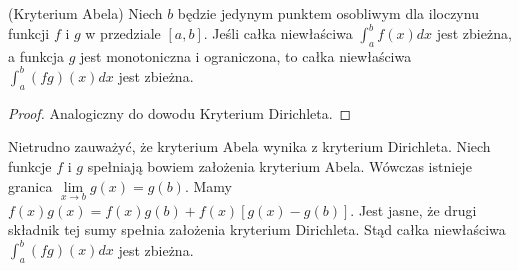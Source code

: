 \documentclass[leqno]{article}
\begin{document}
\begin{justify}
\begin{theorem}
{
    (Kryterium Abela) Niech $b$ będzie jedynym punktem osobliwym dla iloczynu funkcji $f$ i $g$ w przedziale $[a,b]$.
    Jeśli całka niewłaściwa $\int_{a}^{b}f(x)dx$ jest zbieżna, a funkcja $g$ jest monotoniczna i ograniczona, to całka niewłaściwa
    $\int_{a}^{b}(fg)(x)dx$ jest zbieżna.
}
\end{theorem}

\begin{proof}
    Analogiczny do dowodu Kryterium Dirichleta.
\end{proof}

\begin{uwaga}
    Nietrudno zauważyć, że kryterium Abela wynika z kryterium Dirichleta.
    Niech funkcje $f$ i $g$ spełniają bowiem założenia kryterium Abela. Wówczas istnieje granica
    $\lim\limits_{x \to b}g(x) = g(b)$. Mamy $f(x)g(x) = f(x)g(b) + f(x)[g(x) - g(b)]$. Jest jasne, że drugi składnik tej sumy
    spełnia założenia kryterium Dirichleta. Stąd całka niewłaściwa $\int_{a}^{b}(fg)(x)dx$ jest zbieżna. 
\end{uwaga}

\newpage


\end{justify}
\end{document}
